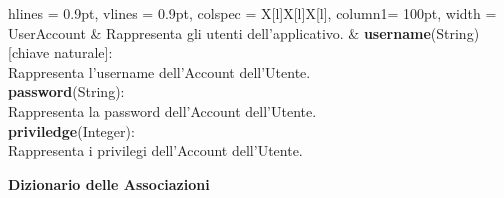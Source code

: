 \begin{tblr}{
    hlines = {0.9pt}, vlines = {0.9pt}, colspec = {X[l]X[l]X[l]}, column{1}= {100pt},
    width = \textwidth
}
{	}
	\\
	{
		UserAccount
	}
	&
	{
		Rappresenta gli utenti dell'applicativo.
	}
	&
	{
		\textbf{username}(String)[chiave naturale]:\\Rappresenta
			l'username dell'Account dell'Utente.\\
		\medskip\textbf{password}(String):\\Rappresenta
			la password dell'Account dell'Utente.\\
		\medskip\textbf{priviledge}(Integer):\\Rappresenta
			i privilegi dell'Account dell'Utente.
	}
	\\
\end{tblr}

\newpage

\begin{center}
	\textbf{Dizionario delle Associazioni}
\end{center}


